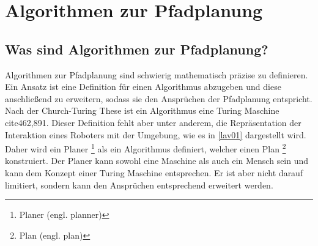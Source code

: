 

\chapter{Algorithmen zur Pfadplanung}%
\section{Was sind Algorithmen zur Pfadplanung?}

Algorithmen zur Pfadplanung sind schwierig mathematisch präzise zu definieren. Ein Ansatz ist eine Definition für einen Algorithmus abzugeben und diese anschließend zu erweitern, sodass sie den Ansprüchen der Pfadplanung entspricht. Nach der Church-Turing These ist ein Algorithmus eine Turing Maschine cite{462,891}. Dieser Definition fehlt aber unter anderem, die Repräsentation der Interaktion eines Roboters mit der Umgebung, wie es in \ref{lav01} dargestellt wird. Daher wird ein Planer \footnote{Planer (engl. planner)} als ein Algorithmus definiert, welcher einen Plan \footnote{Plan (engl. plan)} konstruiert. Der Planer kann sowohl eine Maschine als auch ein Mensch sein und kann dem Konzept einer Turing Maschine entsprechen. Er ist aber nicht darauf limitiert, sondern kann den Ansprüchen entsprechend erweitert werden.\cite[~S. 19ff]{Lav06} 

